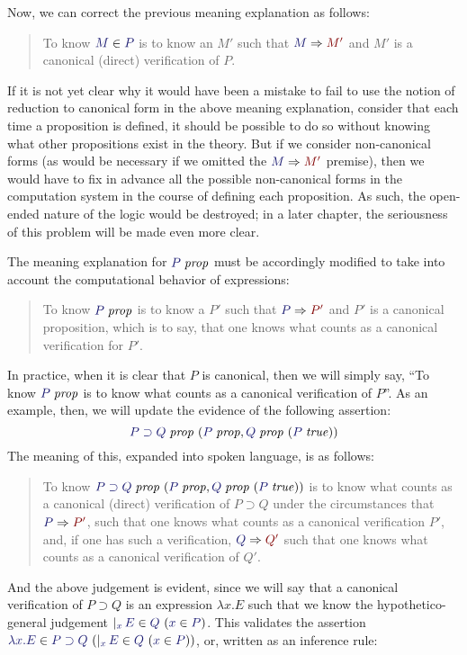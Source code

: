\documentclass[main.tex]{subfiles}
\begin{document}
Now, we can correct the previous meaning explanation as follows:

\begin{quote}
  To know $\ver{M}{P}$ is to know an $M'$ such that $\reduce{M}{M'}$ and $M'$ is a
  canonical (direct) verification of $P$.
\end{quote}

If it is not yet clear why it would have been a mistake to fail to use
the notion of reduction to canonical form in the above meaning
explanation, consider that each time a proposition is defined, it
should be possible to do so without knowing what other propositions
exist in the theory. But if we consider non-canonical forms (as would
be necessary if we omitted the $\reduce{M}{M'}$ premise), then we
would have to fix in advance all the possible non-canonical forms in
the computation system in the course of defining each proposition. As
such, the open-ended nature of the logic would be destroyed; in a
later chapter, the seriousness of this problem will be made even more
clear.


The meaning explanation for $\isprop{P}$ must be accordingly modified to take
into account the computational behavior of expressions:

\begin{quote}
  To know $\isprop{P}$ is to know a $P'$ such that $\reduce{P}{P'}$ and $P'$ is a
  canonical proposition, which is to say, that one knows what counts as a
  canonical verification for $P'$.
\end{quote}

In practice, when it is clear that $P$ is canonical, then we will simply say,
``To know $\isprop{P}$ is to know what counts as a canonical verification of
$P$''. As an example, then, we will update the evidence of the following assertion:
\[\hyp{\isprop{P\supset Q}}{\isprop{P},\hyp{\isprop{Q}}{\istrue{P}}}
\]
The meaning
of this, expanded into spoken language, is as follows:
\begin{quote}
  To know $\hyp{\isprop{P\supset
Q}}{\isprop{P},\hyp{\isprop{Q}}{\istrue{P}}}$ is to know what counts
  as a canonical (direct) verification of $P\supset Q$ under the
  circumstances that $\reduce{P}{P'}$, such that one knows what counts
  as a canonical verification $P'$, and, if one has such a verification,
  $\reduce{Q}{Q'}$ such that one knows what counts as a canonical
  verification of $Q'$.
\end{quote}

And the above judgement is evident, since we will say that a canonical
verification of $P\supset Q$ is an expression $\lambda x. E$ such that
we know the hypothetico-general judgement
$\genj{x}{\hyp{\ver{E}{Q}}{\ver{x}{P}}}$. This validates the assertion
$\hyp{\ver{\lambda x.E}{P\supset
Q}}{\genj{x}{\hyp{\ver{E}{Q}}{\ver{x}{P}}}}$, or, written as an
inference rule:
\end{document}
